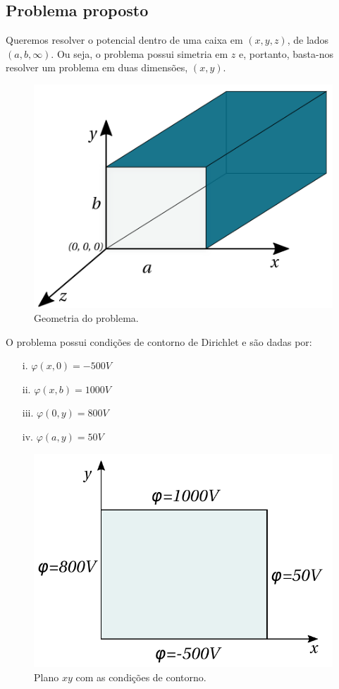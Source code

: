 \documentclass[a4paper,12pt]{article}
\begin{document}
\subsection*{Problema proposto}


Queremos resolver o potencial dentro de uma caixa em $(x, y, z)$, de lados $(a, b, \infty)$. Ou seja, o problema possui simetria em $z$ e, portanto, basta-nos resolver um problema em duas dimensões, $(x, y)$.

\begin{figure}[H]
\centering
\includegraphics[scale=0.5]{img/box}
  \caption{Geometria do problema.}
\end{figure}

O problema possui condições de contorno de Dirichlet e são dadas por:
\begin{enumerate}
  \item[i.] $\varphi(x,0)=-500V$
  \item[ii.] $\varphi(x,b)=1000V$
  \item[iii.] $\varphi(0,y)=800V$
  \item[iv.] $\varphi(a, y) = 50V$
\end{enumerate}

\begin{figure}[H]
\centering
\includegraphics[scale=0.7]{img/boundaries}
  \caption{Plano $xy$ com as condições de contorno.}
\end{figure}
\end{document}
